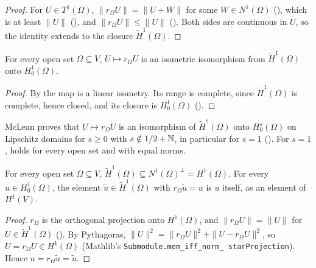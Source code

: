 \begin{proof}
\leanok
For $U \in T^1(\Omega)$, $\|r_\Omega U\| = \|U + W\|$ for some $W \in N^1(\Omega)$
(), which is at least $\|U\|$
(), and $\|r_\Omega U\| \leq \|U\|$
(). Both sides are continuous in $U$, so the identity
extends to the closure $\tilde H^1(\Omega)$.
\end{proof}

\begin{theorem}[$\tilde H^1(\Omega) = H^1_0(\Omega)$ isometrically]
\label{thm:sobolev-tilde-zero-boundary}
\leanok
{}
For every open set $\Omega \subseteq V$, $U \mapsto r_\Omega U$ is an isometric isomorphism from
$\tilde H^1(\Omega)$ onto $H^1_0(\Omega)$.
\end{theorem}

\begin{proof}
\leanok
By  the map is a linear isometry. Its range is
complete, since $\tilde H^1(\Omega)$ is complete, hence closed, and its closure is
$H^1_0(\Omega)$ ().
\end{proof}

McLean proves that $U \mapsto r_\Omega U$ is an isomorphism of $\tilde H^s(\Omega)$ onto
$H^s_0(\Omega)$ on Lipschitz domains for $s \geq 0$ with $s \notin 1/2 + \mathbb{N}$, in particular for
$s = 1$ \cite[Theorem 3.33]{McLean} (). For $s = 1$,
 holds for every open set and with equal norms.

\begin{lemma}
\label{lem:sobolev-tilde-in-restriction}
\leanok
{}
For every open set $\Omega \subseteq V$, $\tilde H^1(\Omega) \subseteq N^1(\Omega)^\perp =
H^1(\Omega)$. For every $u \in H^1_0(\Omega)$, the element $\tilde u \in \tilde H^1(\Omega)$ with
$r_\Omega \tilde u = u$ is $u$ itself, as an element of $H^1(V)$.
\end{lemma}

\begin{proof}
\leanok
$r_\Omega$ is the orthogonal projection onto $H^1(\Omega)$, and $\|r_\Omega U\| = \|U\|$ for
$U \in \tilde H^1(\Omega)$ (). By Pythagoras,
$\|U\|^2 = \|r_\Omega U\|^2 + \|U - r_\Omega U\|^2$, so $U = r_\Omega U \in H^1(\Omega)$ (Mathlib's
\texttt{Submodule.\allowbreak mem\_\allowbreak iff\_\allowbreak norm\_\allowbreak
starProjection}). Hence $u = r_\Omega \tilde u = \tilde u$.
\end{proof}

